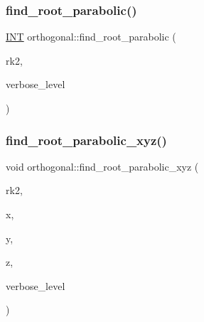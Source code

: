 \mbox{\label{classorthogonal_a2e4453bb31692707f8a9e8b660b2e136}} 
\subsubsection{\texorpdfstring{find\+\_\+root\+\_\+parabolic()}{find\_root\_parabolic()}}
{\footnotesize\ttfamily \mbox{\hyperlink{galois_8h_a09fddde158a3a20bd2dcadb609de11dc}{I\+NT}} orthogonal\+::find\+\_\+root\+\_\+parabolic (\begin{DoxyParamCaption}\item[{\mbox{\hyperlink{galois_8h_a09fddde158a3a20bd2dcadb609de11dc}{I\+NT}}}]{rk2,  }\item[{\mbox{\hyperlink{galois_8h_a09fddde158a3a20bd2dcadb609de11dc}{I\+NT}}}]{verbose\+\_\+level }\end{DoxyParamCaption})}

\mbox{\label{classorthogonal_a17dba83065c664a7d174c4693e87493b}} 
\subsubsection{\texorpdfstring{find\+\_\+root\+\_\+parabolic\+\_\+xyz()}{find\_root\_parabolic\_xyz()}}
{\footnotesize\ttfamily void orthogonal\+::find\+\_\+root\+\_\+parabolic\+\_\+xyz (\begin{DoxyParamCaption}\item[{\mbox{\hyperlink{galois_8h_a09fddde158a3a20bd2dcadb609de11dc}{I\+NT}}}]{rk2,  }\item[{\mbox{\hyperlink{galois_8h_a09fddde158a3a20bd2dcadb609de11dc}{I\+NT}} $\ast$}]{x,  }\item[{\mbox{\hyperlink{galois_8h_a09fddde158a3a20bd2dcadb609de11dc}{I\+NT}} $\ast$}]{y,  }\item[{\mbox{\hyperlink{galois_8h_a09fddde158a3a20bd2dcadb609de11dc}{I\+NT}} $\ast$}]{z,  }\item[{\mbox{\hyperlink{galois_8h_a09fddde158a3a20bd2dcadb609de11dc}{I\+NT}}}]{verbose\+\_\+level }\end{DoxyParamCaption})}

